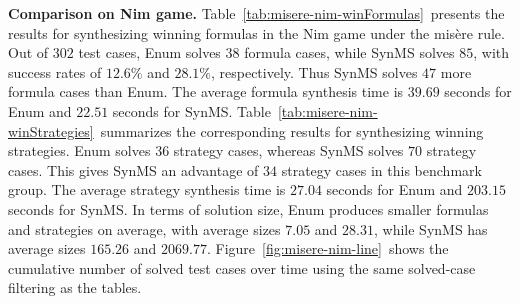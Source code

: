 \documentclass[review]{elsarticle}
\begin{document}
\textbf{Comparison on Nim game.}
Table~\ref{tab:misere-nim-winFormulas}~presents the results for synthesizing winning formulas in the Nim game under the mis\`{e}re rule.
Out of $302$ test cases, Enum solves $38$ formula cases, while SynMS solves $85$, with success rates of $12.6\%$ and $28.1\%$, respectively.
Thus SynMS solves $47$ more formula cases than Enum.
The average formula synthesis time is $39.69$ seconds for Enum and $22.51$ seconds for SynMS.
Table~\ref{tab:misere-nim-winStrategies}~summarizes the corresponding results for synthesizing winning strategies.
Enum solves $36$ strategy cases, whereas SynMS solves $70$ strategy cases.
This gives SynMS an advantage of $34$ strategy cases in this benchmark group.
The average strategy synthesis time is $27.04$ seconds for Enum and $203.15$ seconds for SynMS.
In terms of solution size, Enum produces smaller formulas and strategies on average, with average sizes $7.05$ and $28.31$, while SynMS has average sizes $165.26$ and $2069.77$.
Figure~\ref{fig:misere-nim-line}~shows the cumulative number of solved test cases over time using the same solved-case filtering as the tables.
\end{document}
